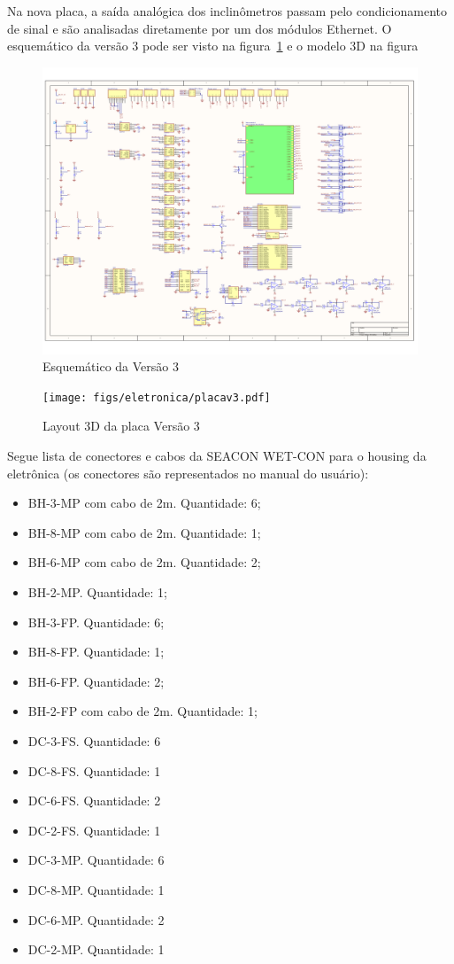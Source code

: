 Na nova placa, a saída analógica dos inclinômetros passam pelo condicionamento
de sinal e são analisadas diretamente por um dos módulos Ethernet. O esquemático
da versão 3 pode ser visto na figura~\ref{esquematicov3} e o modelo 3D na
figura 

\begin{figure}[H]
\centering
\includegraphics[width=1\columnwidth]{figs/eletronica/esquematicov3.pdf}
\caption{Esquemático da Versão 3}
\label{esquematicov3}
\end{figure}

\begin{figure}[H]
\centering
\texttt{[image: figs/eletronica/placav3.pdf]}
\caption{Layout 3D da placa Versão 3}
\label{placav3}
\end{figure}

Segue lista de conectores e cabos da SEACON WET-CON para o housing da
eletrônica (os conectores são representados no manual do usuário):
\begin{itemize}
  \item BH-3-MP com cabo de 2m. Quantidade: 6;
  \item BH-8-MP com cabo de 2m. Quantidade: 1;
  \item BH-6-MP com cabo de 2m. Quantidade: 2;
  \item BH-2-MP. Quantidade: 1;
  \item BH-3-FP. Quantidade: 6;
  \item BH-8-FP. Quantidade: 1;
  \item BH-6-FP. Quantidade: 2;
  \item BH-2-FP com cabo de 2m. Quantidade: 1;
  \item DC-3-FS. Quantidade: 6
\item DC-8-FS. Quantidade: 1	
\item DC-6-FS. Quantidade: 2
\item DC-2-FS. Quantidade: 1
\item DC-3-MP. Quantidade: 6
\item DC-8-MP. Quantidade: 1
\item DC-6-MP. Quantidade: 2
\item DC-2-MP. Quantidade: 1   
\end{itemize}

